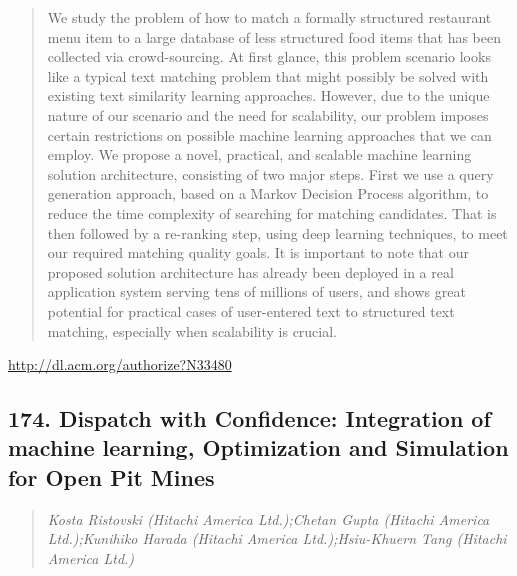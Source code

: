\documentclass{article}
\begin{document}
\begin{quote}
We study the problem of how to match a formally structured restaurant menu item to a large database of less structured food items that has been collected via crowd-sourcing. At first glance, this problem scenario looks like a typical text matching problem that might possibly be solved with existing text similarity learning approaches. However, due to the unique nature of our scenario and the need for scalability, our problem imposes certain restrictions on possible machine learning approaches that we can employ. We propose a novel, practical, and scalable machine learning solution architecture, consisting of two major steps. First we use a query generation approach, based on a Markov Decision Process algorithm, to reduce the time complexity of searching for matching candidates. That is then followed by a re-ranking step, using deep learning techniques, to meet our required matching quality goals. It is important to note that our proposed solution architecture has already been deployed in a real application system serving tens of millions of users, and shows great potential for practical cases of user-entered text to structured text matching, especially when scalability is crucial.
\end{quote}

\href{http://dl.acm.org/authorize?N33480}{http://dl.acm.org/authorize?N33480}

\subsection{174. Dispatch with Confidence: Integration of machine learning, Optimization and Simulation for Open Pit Mines}

\begin{quote}
\footnotesize{\textit{Kosta Ristovski (Hitachi America Ltd.);Chetan Gupta (Hitachi America Ltd.);Kunihiko Harada (Hitachi America Ltd.);Hsiu-Khuern Tang (Hitachi America Ltd.)}}

\end{quote}
\end{document}

